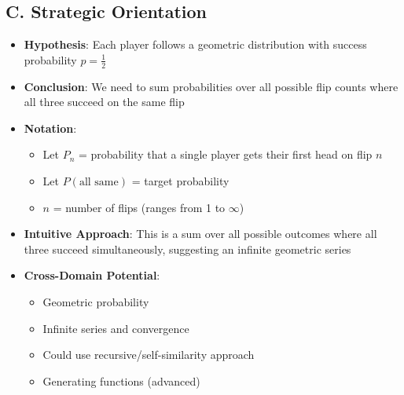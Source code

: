 \documentclass[11pt]{article}
\begin{document}
\begin{problemconfigbox}
\subsection*{C. Strategic Orientation}
\begin{itemize}[leftmargin=*]
    \item \textbf{Hypothesis}: Each player follows a geometric distribution with success probability $p = \frac{1}{2}$
    \item \textbf{Conclusion}: We need to sum probabilities over all possible flip counts where all three succeed on the same flip
    \item \textbf{Notation}: 
    \begin{itemize}
        \item Let $P_n$ = probability that a single player gets their first head on flip $n$
        \item Let $P(\text{all same})$ = target probability
        \item $n$ = number of flips (ranges from 1 to $\infty$)
    \end{itemize}
    \item \textbf{Intuitive Approach}: This is a sum over all possible outcomes where all three succeed simultaneously, suggesting an infinite geometric series
    \item \textbf{Cross-Domain Potential}: 
    \begin{itemize}
        \item Geometric probability
        \item Infinite series and convergence
        \item Could use recursive/self-similarity approach
        \item Generating functions (advanced)
    \end{itemize}
\end{itemize}
\end{problemconfigbox}
\end{document}
